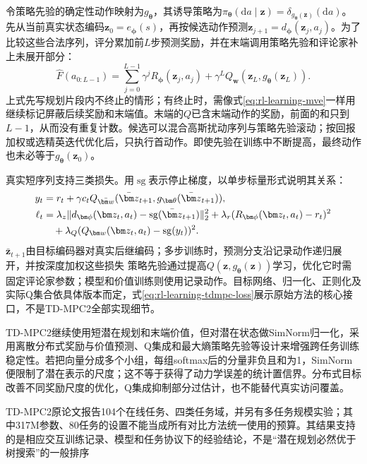 令策略先验的确定性动作映射为$g_{\bm\theta}$，其诱导策略为$\pi_{\bm\theta}(\mathrm da\mid\bm z)=\delta_{g_{\bm\theta}(\bm z)}(\mathrm da)$。先从当前真实状态编码$\bm z_0=e_{\bm\phi}(s)$，再按候选动作预测$\bm z_{j+1}=d_{\bm\phi}(\bm z_j,a_j)$。为了比较这些合法序列，评分累加前$L$步预测奖励，并在末端调用策略先验和评论家补上未展开部分：
\[
  \widehat F(a_{0:L-1})
  =\sum_{j=0}^{L-1}\gamma^j R_{\bm\phi}(\bm z_j,a_j)
      +\gamma^L Q_{\bm w}(\bm z_L,g_{\bm\theta}(\bm z_L)).
\]
上式先写规划片段内不终止的情形；有终止时，需像式\eqref{eq:rl-learning-mve}一样用继续标记屏蔽后续奖励和末端值。末端的$Q$已含末端动作的奖励，前面的和只到$L-1$，从而没有重复计数。候选可以混合高斯扰动序列与策略先验滚动；按回报加权或选精英迭代优化后，只执行首动作。即使先验在训练中不断提高，最终动作也未必等于$g_{\bm\theta}(\bm z_0)$。

真实短序列支持三类损失。用$\operatorname{sg}$表示停止梯度，以单步标量形式说明其关系：
\begin{align}
  y_t&=r_t+\gamma c_t
      Q_{\bar{\bm w}}(\bar{\bm z}_{t+1},
                             g_{\bm\theta}(\bar{\bm z}_{t+1})), \notag\\
  \ell_t&=\lambda_z\|
        d_{\bm\phi}(\bm z_t,a_t)-\operatorname{sg}(\bar{\bm z}_{t+1})
                              \|_2^2
       +\lambda_r(R_{\bm\phi}(\bm z_t,a_t)-r_t)^2 \notag\\
       &\quad+\lambda_Q(Q_{\bm w}(\bm z_t,a_t)
                                      -\operatorname{sg}(y_t))^2.
  \label{eq:rl-learning-tdmpc-loss}
\end{align}
$\bar{\bm z}_{t+1}$由目标编码器对真实后继编码；多步训练时，预测分支沿记录动作递归展开，并按深度加权这些损失
策略先验通过提高$Q(\bm z,g_{\bm\theta}(\bm z))$学习，优化它时需固定评论家参数；模型和价值训练则使用记录动作。目标网络、归一化、正则化及实际Q集合依具体版本而定，式\eqref{eq:rl-learning-tdmpc-loss}展示原始方法的核心接口，不是TD-MPC2全部实现细节。

TD-MPC2继续使用短潜在规划和末端价值，但对潜在状态做SimNorm归一化，采用离散分布式奖励与价值预测、Q集成和最大熵策略先验等设计来增强跨任务训练稳定性。若把向量分成多个小组，每组softmax后的分量非负且和为1，SimNorm便限制了潜在表示的尺度；这不等于获得了动力学误差的统计置信界。分布式目标改善不同奖励尺度的优化，Q集成抑制部分过估计，也不能替代真实访问覆盖。

TD-MPC2原论文报告104个在线任务、四类任务域，并另有多任务规模实验；其中317M参数、80任务的设置不能当成所有对比方法统一使用的预算。其结果支持的是相应交互训练记录、模型和任务协议下的经验结论，不是“潜在规划必然优于树搜索”的一般排序

